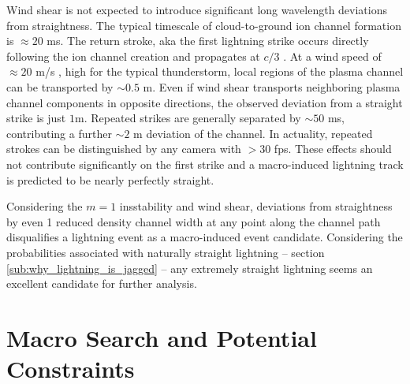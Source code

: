 \documentclass[%
 reprint,
 amsmath,amssymb,
 aps,
]{revtex4-2}
\begin{document}
        Wind shear is not expected to introduce significant long wavelength deviations from straightness. The typical timescale of cloud-to-ground ion channel formation is ${\approx 20}$ ms. The return stroke, aka the first lightning strike \citep{DwyerUman2014} occurs directly following the ion channel creation and propagates at $c/3$ \citep{Idone1987}. At a wind speed of ${\approx 20}$ m/s \citep{Choi2004}, high for the typical thunderstorm, local regions of the plasma channel can be transported by ${\sim 0.5}$ m. Even if wind shear transports neighboring plasma channel components in opposite directions, the observed deviation from a straight strike is just $1$m. Repeated strikes are generally separated by ${\sim 50}$ ms, contributing a further ${\sim 2}$ m deviation of the channel. In actuality, repeated strokes can be distinguished by any camera with $>30$ fps. These effects should not contribute significantly on the first strike and a macro-induced lightning track is predicted to be nearly perfectly straight.

        Considering the $m=1$ insstability and wind shear, deviations from straightness by even 1 reduced density channel width at any point along the channel path disqualifies a lightning event as a macro-induced event candidate. Considering the probabilities associated with naturally straight lightning -- section \ref{sub:why_lightning_is_jagged} -- any extremely straight lightning seems an excellent candidate for further analysis.




\section{Macro Search and Potential Constraints}%
\label{sec:macro_search_and_constraints}
\end{document}
